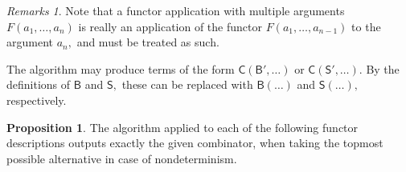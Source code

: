 \documentclass[a4paper]{article}
\theoremstyle{definition}
\newtheorem{proposition}[definition]{Proposition}
\theoremstyle{remark}
\newtheorem*{remarks}{Remarks}
\newcommand{\nm}{\mathsf}
\newcommand{\combinator}{\nm}
\newcommand{\idFun}{\combinator{I}}
\newcommand{\revAppFun}{\combinator{T}}
\newcommand{\constFun}{\combinator{K}}
\newcommand{\compFun}{\combinator{B'}}
\newcommand{\revCompFun}{\combinator{B}}
\newcommand{\swapFun}{\combinator{C}}
\newcommand{\substFun}{\combinator{S'}}
\newcommand{\revSubstFun}{\combinator{S}}
\begin{document}
\begin{remarks}
  Note that a functor application with multiple arguments $F(a_1,\dots,a_n)$ is really an
  application of the functor $F(a_1,\dots,a_{n-1})$ to the argument $a_n,$ and must be treated as
  such.

  The algorithm may produce terms of the form $\swapFun(\compFun,\ldots)$ or
  $\swapFun(\substFun,\ldots).$ By the definitions of $\revCompFun$ and $\revSubstFun,$
  these can be replaced with $\revCompFun(\ldots)$ and $\revSubstFun(\ldots),$
  respectively.
\end{remarks}

\begin{proposition}
  \label{prp:layer1-combinator-def}
  The algorithm applied to each of the following functor descriptions outputs exactly the given
  combinator, when taking the topmost possible alternative in case of nondeterminism.
\end{proposition}
\end{document}
